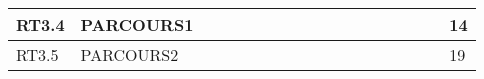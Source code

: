 \begin{table}
{\begin{tabular}{|l|l|l|l|l|l|l|l|l|l|l|l|l|l|l|l|l|l|}
RT3.4 & PARCOURS1  &                                                       &                                                                                                   &                                                                                                       &                                                         &                                                                                                                  &                                                                                                             &                                                     &                                                                                                                &                                                                                                           &                                                                                                                         &                                                          &                                                                                                                                &                                         &                                                                                                                 &                                                                                                                                                & 14                                                                                                               \\ \hline
RT3.5 & PARCOURS2  &                                                       &                                                                                                   &                                                                                                       &                                                         &                                                                                                                  &                                                                                                             &                                                     &                                                                                                                &                                                                                                           &                                                                                                                         &                                                          &                                                                                                                                &                                         &                                                                                                                 &                                                                                                                                                & 19                                                                                                   \\ \hline            

\end{tabular}}
\end{table}
